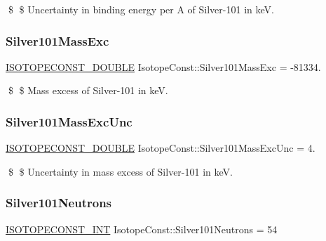 \$ \$ Uncertainty in binding energy per A of Silver-\/101 in keV. \mbox{\label{group___isotope_const-_silver-_ag101_gaefffa2f550b6977866a126229ba25a55}} 
\subsubsection{\texorpdfstring{Silver101\+Mass\+Exc}{Silver101MassExc}}
{\footnotesize\ttfamily \mbox{\hyperlink{group___isotope_const-_macros_ga8f45a7272ce02c0b4c65c44636ed719a}{I\+S\+O\+T\+O\+P\+E\+C\+O\+N\+S\+T\+\_\+\+D\+O\+U\+B\+LE}} Isotope\+Const\+::\+Silver101\+Mass\+Exc = -\/81334.}

\$ \$ Mass excess of Silver-\/101 in keV. \mbox{\label{group___isotope_const-_silver-_ag101_gaca8d102c474f0f26403055c42e785739}} 
\subsubsection{\texorpdfstring{Silver101\+Mass\+Exc\+Unc}{Silver101MassExcUnc}}
{\footnotesize\ttfamily \mbox{\hyperlink{group___isotope_const-_macros_ga8f45a7272ce02c0b4c65c44636ed719a}{I\+S\+O\+T\+O\+P\+E\+C\+O\+N\+S\+T\+\_\+\+D\+O\+U\+B\+LE}} Isotope\+Const\+::\+Silver101\+Mass\+Exc\+Unc = 4.}

\$ \$ Uncertainty in mass excess of Silver-\/101 in keV. \mbox{\label{group___isotope_const-_silver-_ag101_ga375d1e9b53cf037fb7e006544c6799cd}} 
\subsubsection{\texorpdfstring{Silver101\+Neutrons}{Silver101Neutrons}}
{\footnotesize\ttfamily \mbox{\hyperlink{group___isotope_const-_macros_ga5f18360b3e99483a35c32d789e62621c}{I\+S\+O\+T\+O\+P\+E\+C\+O\+N\+S\+T\+\_\+\+I\+NT}} Isotope\+Const\+::\+Silver101\+Neutrons = 54}

